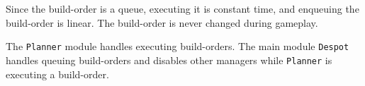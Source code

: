 Since the build-order is a queue, executing it is constant time, and enqueuing the build-order is linear. The build-order is never changed during gameplay.

The \texttt{Planner} module handles executing build-orders. The main module \texttt{Despot} handles queuing build-orders and disables other managers while \texttt{Planner} is executing a build-order.